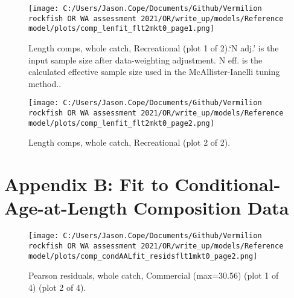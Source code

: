 \documentclass[11pt,
  english,
  a4paper,
]{article}
\begin{document}
\begin{figure}
\centering
\texttt{[image: C:/Users/Jason.Cope/Documents/Github/Vermilion rockfish OR WA assessment 2021/OR/write\_up/models/Reference model/plots/comp\_lenfit\_flt2mkt0\_page1.png]}
\caption{Length comps, whole catch, Recreational (plot 1 of 2).`N adj.' is the input sample size after data-weighting adjustment. N eff. is the calculated effective sample size used in the McAllister-Ianelli tuning method..\label{fig:comp_lenfit_flt2mkt0_page1}}
\end{figure}

\tagmcend\tagstructend


\begin{figure}
\centering
\texttt{[image: C:/Users/Jason.Cope/Documents/Github/Vermilion rockfish OR WA assessment 2021/OR/write\_up/models/Reference model/plots/comp\_lenfit\_flt2mkt0\_page2.png]}
\caption{Length comps, whole catch, Recreational (plot 2 of 2).\label{fig:comp_lenfit_flt2mkt0_page2}}
\end{figure}

\tagmcend\tagstructend

\clearpage


\hypertarget{app-b}{%
\section{Appendix B: Fit to Conditional-Age-at-Length Composition Data}\label{app-b}}

\leavevmode\tagmcend\tagstructend


\begin{figure}
\centering
\texttt{[image: C:/Users/Jason.Cope/Documents/Github/Vermilion rockfish OR WA assessment 2021/OR/write\_up/models/Reference model/plots/comp\_condAALfit\_residsflt1mkt0\_page2.png]}
\caption{Pearson residuals, whole catch, Commercial (max=30.56) (plot 1 of 4) (plot 2 of 4).\label{fig:comp_condAALfit_residsflt1mkt0_page2}}
\end{figure}
\end{document}
